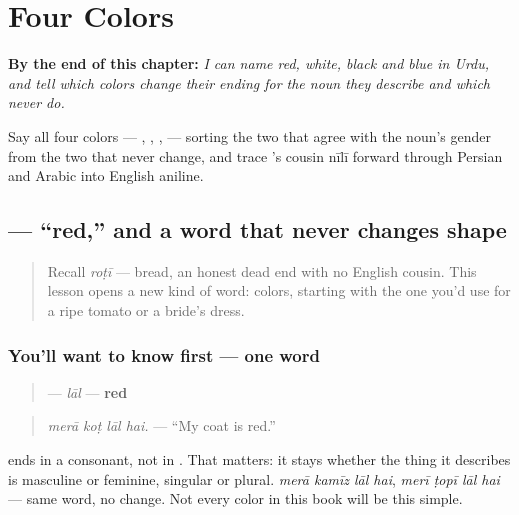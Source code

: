 
\chapter{Four Colors}
\label{ch:ur-colors}

\begin{chapteropening}
\textbf{By the end of this chapter:} \emph{I can name red, white, black and blue in Urdu, and tell which colors change their ending for the noun they describe and which never do.}

Say all four colors — , , ,  — sorting the two that agree with the noun's gender from the two that never change, and trace 's cousin nīlī forward through Persian and Arabic into English aniline.
\end{chapteropening}

\section[\texorpdfstring{\ur{لال} (lāl)}{لال (lāl)}]{ — \textquotedblleft{}red,\textquotedblright{} and a word that never changes shape}

\label{lesson:UR-C13-lal}



\begin{quote}
Recall \emph{roṭī} — bread, an honest dead end with no English cousin. This lesson opens a new kind of word: colors, starting with the one you'd use for a ripe tomato or a bride's dress.
\end{quote}

\subsection*{You'll want to know first — one word}
\begin{quote}
\textbf{} — \emph{lāl} — \textbf{red}
\end{quote}

\begin{quote}
\emph{merā koṭ lāl hai.} — \textquotedblleft{}My coat is red.\textquotedblright{}
\end{quote}

\begin{grammarlens}[title={Grammar Lens: a color that never agrees}]
\textbf{} ends in a consonant, not in \textbf{}. That matters: it stays \textbf{} whether the thing it describes is masculine or feminine, singular or plural. \emph{merā kamīz lāl hai}, \emph{merī ṭopī lāl hai} — same word, no change. Not every color in this book will be this simple.
\end{grammarlens}

